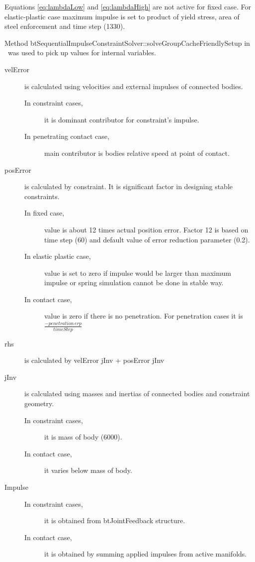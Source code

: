 Equations \ref{eq:lambdaLow} and \ref{eq:lambdaHigh} are not active for fixed case.
For elastic-plastic case maximum impulse is set to product of yield stress, area of steel enforcement and time step (1330).

Method btSequentialImpulseConstraintSolver::solveGroupCacheFriendlySetup
in \bullet\ was used to pick up values for internal variables. 

\begin{description}
\item[velError] is calculated using velocities and external impulses of connected bodies. 
 \begin{description}
\item[In constraint cases,] it is dominant contributor for constraint's impulse.
\item[In penetrating contact case,] main contributor is bodies relative speed at point of contact. 
\end{description}
\item[posError] is calculated by constraint. It is significant factor in designing stable constraints.
 \begin{description}
 \item[In fixed case,] value is about 12 times actual position error. Factor 12 is based on time step (60) 
 and default value of error reduction parameter (0.2).
 \item[In elastic plastic case,]  value is set to zero if impulse would be larger than maximum impulse or
spring simulation cannot be done in stable way.
 \item[In contact case,] value is zero if there is no penetration. For penetration cases it is 
$\frac{-penetration\, erp}{timeStep}$
 \end{description}
\item[rhs] is calculated by velError jInv + posError jInv
\item[jInv] is calculated using masses and inertias of connected bodies and constraint geometry. 
 \begin{description}
\item[In constraint cases,] it is mass of body (6000).
\item[In contact case,] it varies below mass of body.
\end{description}
\item[Impulse]
 \begin{description}
\item[In constraint cases,] it is obtained from btJointFeedback structure.
\item[In contact case,] it is obtained by summing applied impulses from active manifolds.
\end{description}
\end{description}

